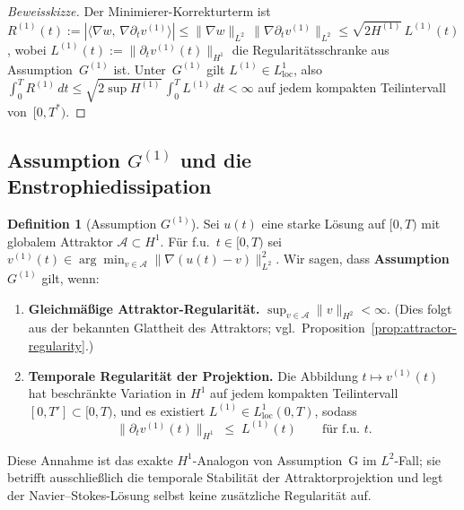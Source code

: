 \documentclass[12pt,a4paper]{article}
\theoremstyle{definition}
\newtheorem{definition}{Definition}[section]
\theoremstyle{plain}
\theoremstyle{remark}
\begin{document}
\begin{proof}[Beweisskizze]
Der Minimierer-Korrekturterm ist
$R^{(1)}(t) := |\langle \nabla w,\,
\nabla\partial_t v^{(1)}\rangle|
\le \|\nabla w\|_{L^2}\,\|\nabla\partial_t v^{(1)}\|_{L^2}
\le \sqrt{2H^{(1)}}\,L^{(1)}(t)$,
wobei $L^{(1)}(t) := \|\partial_t v^{(1)}(t)\|_{H^1}$ die
Regularitätsschranke aus Assumption~$G^{(1)}$ ist.
Unter~$G^{(1)}$ gilt $L^{(1)} \in L^1_{\mathrm{loc}}$, also
$\int_0^T R^{(1)}\,dt
\le \sqrt{2\sup H^{(1)}}\,\int_0^T L^{(1)}\,dt < \infty$
auf jedem kompakten Teilintervall von~$[0,T^*)$.
\end{proof}

\subsection{Assumption \texorpdfstring{$G^{(1)}$}{G(1)} und die Enstrophiedissipation}

\begin{definition}[Assumption $G^{(1)}$]\label{ass:G1}
Sei $u(t)$ eine starke Lösung auf $[0,T)$ mit globalem Attraktor
$\mathcal{A} \subset H^1$. Für f.u.\ $t \in [0,T)$ sei
$v^{(1)}(t) \in \arg\min_{v \in \mathcal{A}}
\|\nabla(u(t)-v)\|_{L^2}^2$.
Wir sagen, dass \textbf{Assumption~$G^{(1)}$} gilt, wenn:
\begin{enumerate}
  \item[\emph{($G^{(1)}.1$)}]
    \textbf{Gleichmäßige Attraktor-Regularität.}\;
    $\sup_{v \in \mathcal{A}}\|v\|_{H^2} < \infty$.
    (Dies folgt aus der bekannten Glattheit des Attraktors;
    vgl.\ Proposition~\ref{prop:attractor-regularity}.)
  \item[\emph{($G^{(1)}.2$)}]
    \textbf{Temporale Regularität der Projektion.}\;
    Die Abbildung $t \mapsto v^{(1)}(t)$ hat beschränkte Variation in $H^1$
    auf jedem kompakten Teilintervall $[0,T'] \subset [0,T)$, und
    es existiert $L^{(1)} \in L^1_{\mathrm{loc}}(0,T)$, sodass
    \[
      \|\partial_t v^{(1)}(t)\|_{H^1}
      \;\le\; L^{(1)}(t)
      \qquad \text{für f.u.\ } t.
    \]
\end{enumerate}
Diese Annahme ist das exakte $H^1$-Analogon von Assumption~G im
$L^2$-Fall; sie betrifft ausschließlich die temporale Stabilität der
Attraktorprojektion und legt der Navier--Stokes-Lösung selbst keine
zusätzliche Regularität auf.
\end{definition}
\end{document}
